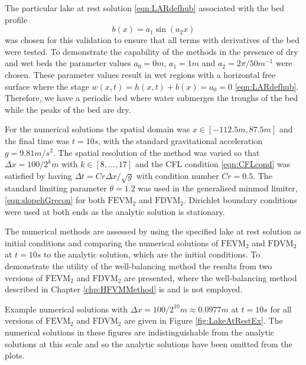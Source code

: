 The particular lake at rest solution \eqref{eqn:LARdefhub} associated with the bed profile
\begin{equation}
b(x) = a_1 \sin\left(a_2 x\right)
\end{equation}
was chosen for this validation to ensure that all terms with derivatives of the bed were tested. To demonstrate the capability of the methods in the presence of dry and wet beds the parameter values $a_0 = 0m$, $a_1 = 1m$ and $a_2 = 2 \pi / 50 m^{-1} $ were chosen. These parameter values result in wet regions with a horizontal free surface where the stage $w(x,t)= h(x,t) + b(x) =a_0= 0$ \eqref{eqn:LARdefhub}. Therefore, we have a periodic bed where water submerges the troughs of the bed while the peaks of the bed are dry. 

For the numerical solutions the spatial domain was $x \in \left[-112.5 m,87.5 m\right]$ and the final time was $t=10s$, with the standard gravitational acceleration $g= 9.81 m/s^2$. The spatial resolution of the method was varied so that $\Delta x = 100 / 2^k m$ with $k \in \left[8, \dots  ,17\right]$ and the CFL condition \eqref{eqn:CFLcond} was satisfied by having $\Delta t = Cr \Delta x / \sqrt{g}$ with condition number $Cr = 0.5$. The standard limiting parameter $\theta = 1.2$ was used in the generalised minmod limiter, \eqref{eqn:slopehGrecon} for both $\text{FEVM}_2$ and $\text{FDVM}_2$. Dirichlet boundary conditions were used at both ends as the analytic solution is stationary.

The numerical methods are assessed by using the specified lake at rest solution as initial conditions and comparing the numerical solutions of $\text{FEVM}_2$ and $\text{FDVM}_2$ at $t=10s$ to the analytic solution, which are the initial conditions. To demonstrate the utility of the well-balancing method the results from two versions of $\text{FEVM}_2$ and $\text{FDVM}_2$ are presented, where the well-balancing method described in Chapter \ref{chp:HFVMMethod} is and is not employed.   

Example numerical solutions with $\Delta x = 100/2^{10}m \approx 0.0977m$ at $t=10s$ for all versions of $\text{FEVM}_2$ and $\text{FDVM}_2$ are given in Figure \ref{fig:LakeAtRestEx}. The numerical solutions in these figures are indistinguishable from the analytic solutions at this scale and so the analytic solutions have been omitted from the plots.  

